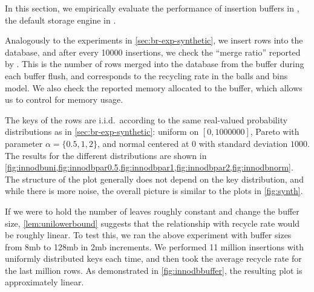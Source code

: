 In this section, we empirically evaluate the performance of insertion buffers
in \innodb{}, the default storage engine in \mysql{}.

Analogously to the experiments in \cref{sec:br-exp-synthetic}, we insert rows into
the \mysql{} database, and after every 10000 insertions, we check the ``merge
ratio'' reported by \innodb{}.  This is the number of rows merged into the
database from the buffer during each buffer flush, and corresponds to the
recycling rate in the balls and bins model. We also check the reported memory
allocated to the buffer, which allows us to control for memory usage. 



The keys of the rows are i.i.d.\ according to the same real-valued probability
distributions as in \cref{sec:br-exp-synthetic}: uniform on $[0,1000000]$, Pareto
with parameter $\alpha = \{0.5,1,2\}$, and normal centered at 0 with standard
deviation $1000$. The results for the different distributions are shown in
\cref{fig:innodbuni,fig:innodbpar0.5,fig:innodbpar1,fig:innodbpar2,fig:innodbnorm}.
The structure of the plot generally does not depend on the key distribution,
and while there is more noise, the overall picture is similar to the plots in
\cref{fig:synth}. 

If we were to hold the number of leaves roughly constant and change the buffer
size, \cref{lem:unilowerbound} suggests that the relationship with recycle rate
would be roughly linear. To test this, we ran the above experiment with buffer
sizes from 8mb to 128mb in 2mb increments. We performed 11 million insertions
with uniformly distributed keys each time, and then took the average recycle
rate for the last million rows. As demonstrated in \cref{fig:innodbbuffer}, the
resulting plot is approximately linear.

